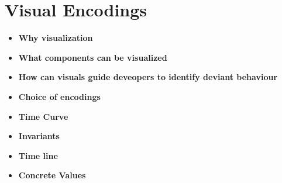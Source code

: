 \section{Visual Encodings}
\label{sec:visual-encodings}


\begin{itemize}
    \item \textbf{Why visualization}
    \item \textbf{What components can be visualized}
    \item \textbf{How can visuals guide deveopers to identify deviant behaviour}
    \item \textbf{Choice of encodings}
    \item \textbf{Time Curve}
    \item \textbf{Invariants}
    \item \textbf{Time line}
    \item \textbf{Concrete Values}
\end{itemize}
